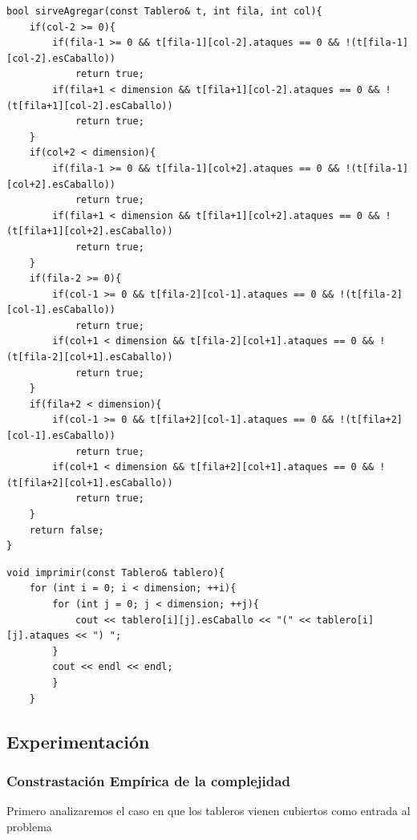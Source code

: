 \newpage

	\begin{codesnippet}
	\begin{verbatim}
bool sirveAgregar(const Tablero& t, int fila, int col){
    if(col-2 >= 0){
        if(fila-1 >= 0 && t[fila-1][col-2].ataques == 0 && !(t[fila-1][col-2].esCaballo))
            return true;
        if(fila+1 < dimension && t[fila+1][col-2].ataques == 0 && !(t[fila+1][col-2].esCaballo))
            return true;
    }
    if(col+2 < dimension){
        if(fila-1 >= 0 && t[fila-1][col+2].ataques == 0 && !(t[fila-1][col+2].esCaballo))
            return true;
        if(fila+1 < dimension && t[fila+1][col+2].ataques == 0 && !(t[fila+1][col+2].esCaballo)) 
            return true;
    }
    if(fila-2 >= 0){
        if(col-1 >= 0 && t[fila-2][col-1].ataques == 0 && !(t[fila-2][col-1].esCaballo)) 
            return true;
        if(col+1 < dimension && t[fila-2][col+1].ataques == 0 && !(t[fila-2][col+1].esCaballo))
            return true;
    }
    if(fila+2 < dimension){
        if(col-1 >= 0 && t[fila+2][col-1].ataques == 0 && !(t[fila+2][col-1].esCaballo)) 
            return true;
        if(col+1 < dimension && t[fila+2][col+1].ataques == 0 && !(t[fila+2][col+1].esCaballo)) 
            return true;
    }
    return false;
}
	\end{verbatim}
	\end{codesnippet}
	
		\begin{codesnippet}
	\begin{verbatim}
void imprimir(const Tablero& tablero){
    for (int i = 0; i < dimension; ++i){
        for (int j = 0; j < dimension; ++j){
            cout << tablero[i][j].esCaballo << "(" << tablero[i][j].ataques << ") ";
        }
        cout << endl << endl;    
        }
    }
	\end{verbatim}
	\end{codesnippet}

\newpage
\subsection{Experimentaci\'on}

\subsubsection{Constrastaci\'on Emp\'irica de la complejidad}\label{tiempos}

Primero analizaremos el caso en que los tableros vienen cubiertos como entrada al problema

